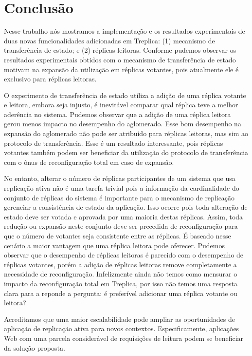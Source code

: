 \chapter*[Conclusão]{Conclusão}\label{sec:conclusao}

Nesse trabalho nós mostramos a implementação e os resultados experimentais de duas novas
funcionalidades adicionadas em Treplica: (1) mecanismo de transferência de estado; e (2)
réplicas leitoras. Conforme pudemos observar os resultados experimentais obtidos com o
mecanismo de transferência de estado motivam na expansão da utilização em réplicas
votantes, pois atualmente ele é exclusivo para réplicas leitoras.

O experimento de transferência de estado utiliza a adição de uma réplica votante e
leitora, embora seja injusto, é inevitável comparar qual réplica teve a melhor aderência
no sistema. Pudemos observar que a adição de uma réplica leitora gerou menos impacto no
desempenho do aglomerado. Esse bom desempenho na expansão do aglomerado não pode ser
atribuído para réplicas leitoras, mas sim ao protocolo de transferência. Esse é um
resultado interessante, pois réplicas votantes também podem ser beneficiar da utilização
do protocolo de transferência com o ônus de reconfiguração total \cite{lamport10} em
caso de expansão.

No entanto, alterar o número de réplicas participantes de um sistema que usa replicação
ativa não é uma tarefa trivial pois a informação da cardinalidade do conjunto de réplicas
do sistema é importante para o mecanismo de replicação gerenciar a consistência de estado
da aplicação. Isso ocorre pois toda alteração de estado deve ser votada e aprovada por uma
maioria destas réplicas. Assim, toda redução ou expansão neste conjunto deve ser precedida
de reconfiguração para que o número de votantes seja consistente entre as réplicas. É
baseado nesse cenário a maior vantagem que uma réplica leitora pode oferecer. Pudemos
observar que o desempenho de réplicas leitoras é parecido com o desempenho de réplicas
votantes, porém a adição de réplicas leitoras remove completamente a necessidade de
reconfiguração. Infelizmente ainda não temos como mensurar o impacto da reconfiguração
total em Treplica, por isso não temos uma resposta clara para a reponde a pergunta: é
preferível adicionar uma réplica votante ou leitora?

Acreditamos que uma maior escalabilidade pode ampliar as oportunidades de aplicação de
replicação ativa para novos contextos. Especificamente, aplicações Web com uma parcela
considerável de requisições de leitura podem se beneficiar da solução proposta.

